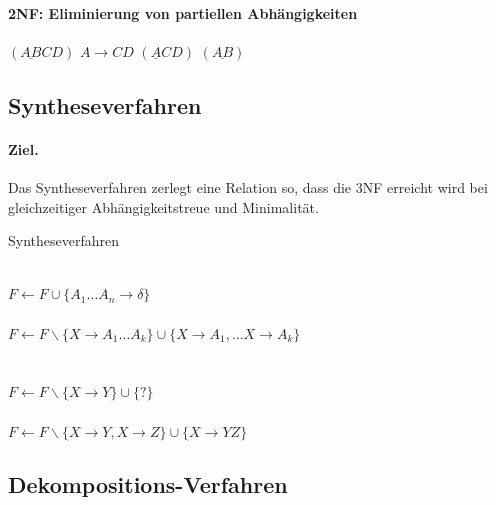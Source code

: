 \documentclass[]{scrartcl}
\begin{document}
\paragraph{2NF: Eliminierung von partiellen Abh\"angigkeiten} 
$(\underline{AB}CD)$ $A \to CD$
$(\underline{A}CD)$ $(\underline{AB})$




\subsection{Syntheseverfahren}

\paragraph{Ziel. } Das Syntheseverfahren zerlegt eine Relation so, dass die 3NF erreicht wird bei gleichzeitiger Abh\"angigkeitstreue und Minimalit\"at.

\begin{algorithm}
\caption{Syntheseverfahren}


 \\
$F \gets F \cup \{ A_{1} \dots A_{n} \to \delta \}$ \\
 \\
 {
$F \gets F \backslash \{ X \to A_{1} \dots A_{k}\} \cup \{ X \to A_{1}, \dots X \to A_{k}\}$ \\
}
 \\
 {
}
 \\
 {
	 {
		$F \gets F \backslash \{ X \to Y\} \cup \{ ?\}$ \\
	}
}
 \\
 {
	$F \gets F \backslash \{ X \to Y, X \to Z\} \cup \{ X \to YZ \}$ \\
}
\Comment


\end{algorithm}

\subsection{Dekompositions-Verfahren}
\end{document}

